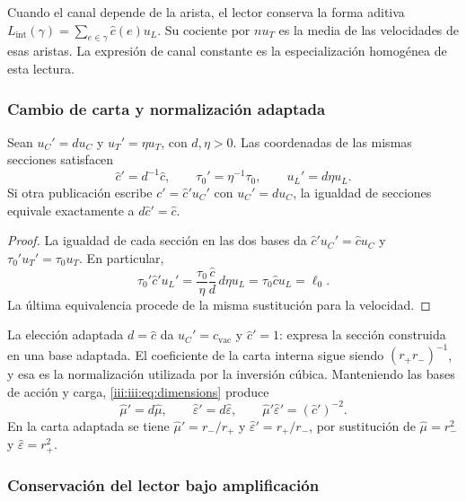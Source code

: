Cuando el canal depende de la arista, el lector conserva la forma aditiva
$L_{\mathrm{int}}(\gamma)=\sum_{e\in\gamma}\widehat c(e)u_L$.
Su cociente por $nu_T$ es la media de las velocidades de esas aristas.
La expresión de canal constante es la especialización homogénea de
esta lectura.

\subsubsection{Cambio de carta y normalización adaptada}

\begin{proposition}
Sean $u_C'=d u_C$ y $u_T'=\eta u_T$, con $d,\eta>0$.
Las coordenadas de las mismas secciones satisfacen
\begin{equation}
 \widehat c'=d^{-1}\widehat c,
 \qquad \tau_0'=\eta^{-1}\tau_0,
 \qquad u_L'=d\eta u_L.
 \label{iii:iii:eq:velocidad-cambio-carta}
\end{equation}
Si otra publicación escribe $c'=\widehat c' u_C'$ con $u_C'=d u_C$,
la igualdad de secciones equivale exactamente a $d\widehat c'=\widehat c$.
\end{proposition}
\begin{proof}
La igualdad de cada sección en las dos bases da
$\widehat c'u_C'=\widehat c u_C$ y $\tau_0'u_T'=\tau_0u_T$.
En particular,
\[
 \tau_0'\widehat c'u_L'
 =\frac{\tau_0}{\eta}\frac{\widehat c}{d}\,d\eta u_L
 =\tau_0\widehat c u_L=\ell_0.
\]
La última equivalencia procede de la misma sustitución para la velocidad.
\end{proof}

La elección adaptada $d=\widehat c$ da $u_C'=c_{\mathrm{vac}}$ y
$\widehat c'=1$: expresa la sección construida en una base adaptada.
El coeficiente de la carta interna sigue siendo $(r_+r_-)^{-1}$, y esa
es la normalización utilizada por la inversión cúbica. Manteniendo las
bases de acción y carga, \eqref{iii:iii:eq:dimensions} produce
\[
 \widehat\mu'=d\widehat\mu,\qquad
 \widehat\varepsilon'=d\widehat\varepsilon,\qquad
 \widehat\mu'\widehat\varepsilon'=(\widehat c')^{-2}.
\]
En la carta adaptada se tiene $\widehat\mu'=r_-/r_+$ y
$\widehat\varepsilon'=r_+/r_-$, por sustitución de
$\widehat\mu=r_-^2$ y $\widehat\varepsilon=r_+^2$.

\subsubsection{Conservación del lector bajo amplificación}

